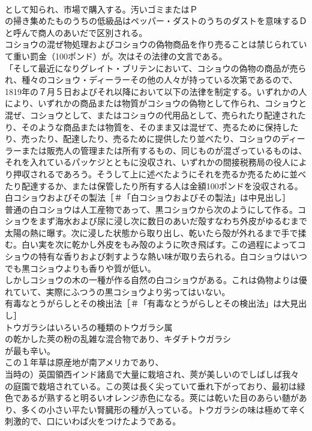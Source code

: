 \documentclass[8pt]{extreport}
\begin{document}
\begin{CJK}{UTF8}{min}
\\	として知られ、市場で購入する。汚いゴミまたはＰ
\\	の掃き集めたものうちの低級品はペッパー・ダストのうちのダストを意味するＤ
\\	と呼んで商人のあいだで区別される。
\\	コショウの混ぜ物処理およびコショウの偽物商品を作り売ることは禁じられていて重い罰金（100ポンド）が。次はその法律の文言である。
\\	「そして最近になりグレイト・ブリテンにおいて、コショウの偽物の商品が売られ、種々のコショウ・ディーラーその他の人々が持っている次第であるので、1819年の７月５日およびそれ以降において以下の法律を制定する。いずれかの人により、いずれかの商品または物質がコショウの偽物として作られ、コショウと混ぜ、コショウとして、またはコショウの代用品として、売られたり配達されたり、そのような商品または物質を、そのまま又は混ぜて、売るために保持したり、売ったり、配達したり、売るために提供したり並べたり、コショウのディーラーまたは販売人の管理または所有するもの、同じものが混ざっているものは、それを入れているパッケジとともに没収され、いずれかの間接税務局の役人により押収されるであろう。そうして上に述べたようにそれを売るか売るために並べたり配達するか、または保管したり所有する人は金額100ポンドを没収される。
\\	白コショウおよびその製法［＃「白コショウおよびその製法」は中見出し］
\\	普通の白コショウは人工産物であって、黒コショウから次のようにして作る。コショウをまず海水および尿に浸し次に数日のあいだ殻すなわち外皮がゆるむまで太陽の熱に曝す。次に浸した状態から取り出し、乾いたら殻が外れるまで手で揉む。白い実を次に乾かし外皮をもみ殻のように吹き飛ばす。この過程によってコショウの特有な香りおよび刺すような熱い味が取り去られる。白コショウはいつでも黒コショウよりも香りや質が低い。
\\	しかしコショウの木の一種が作る自然の白コショウがある。これは偽物よりは優れていて、実際にふつうの黒コショウより劣ってはいない。
\\	有毒なとうがらしとその検出法［＃「有毒なとうがらしとその検出法」は大見出し］
\\	トウガラシはいろいろの種類のトウガラシ属
\\	の乾かした莢の粉の乱雑な混合物であり、キダチトウガラシ
\\	が最も辛い。
\\	この１年草は原産地が南アメリカであり、
\\	当時の）英国領西インド諸島で大量に栽培され、莢が美しいのでしばしば我々の庭園で栽培されている。この莢は長く尖っていて垂れ下がっており、最初は緑色であるが熟すると明るいオレンジ赤色になる。莢には乾いた目のあらい髄があり、多くの小さい平たい腎臓形の種が入っている。トウガラシの味は極めて辛く刺激的で、口にいわば火をつけたようである。

\end{CJK}
\end{document}

